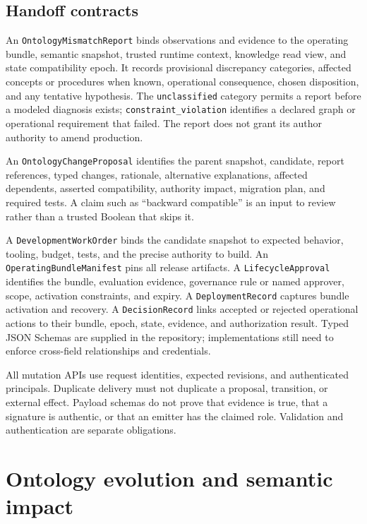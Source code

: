 \documentclass[preprint,12pt,authoryear]{elsarticle}
\begin{document}
\subsection{Handoff contracts}\label{handoff-contracts}

An \texttt{OntologyMismatchReport} binds observations and evidence to
the operating bundle, semantic snapshot, trusted runtime context,
knowledge read view, and state compatibility epoch. It records
provisional discrepancy categories, affected concepts or procedures when
known, operational consequence, chosen disposition, and any tentative
hypothesis. The \texttt{unclassified} category permits a report before a
modeled diagnosis exists; \texttt{constraint\_violation} identifies a
declared graph or operational requirement that failed. The report does
not grant its author authority to amend production.

An \texttt{OntologyChangeProposal} identifies the parent snapshot,
candidate, report references, typed changes, rationale, alternative
explanations, affected dependents, asserted compatibility, authority
impact, migration plan, and required tests. A claim such as ``backward
compatible'' is an input to review rather than a trusted Boolean that
skips it.

A \texttt{DevelopmentWorkOrder} binds the candidate snapshot to expected
behavior, tooling, budget, tests, and the precise authority to build. An
\texttt{OperatingBundleManifest} pins all release artifacts. A
\texttt{LifecycleApproval} identifies the bundle, evaluation evidence,
governance rule or named approver, scope, activation constraints, and
expiry. A \texttt{DeploymentRecord} captures bundle activation and
recovery. A \texttt{DecisionRecord} links accepted or rejected
operational actions to their bundle, epoch, state, evidence, and
authorization result. Typed JSON Schemas are supplied in the repository;
implementations still need to enforce cross-field relationships and
credentials.

All mutation APIs use request identities, expected revisions, and
authenticated principals. Duplicate delivery must not duplicate a
proposal, transition, or external effect. Payload schemas do not prove
that evidence is true, that a signature is authentic, or that an emitter
has the claimed role. Validation and authentication are separate
obligations.

\section{Ontology evolution and semantic
impact}\label{ontology-evolution-and-semantic-impact}
\end{document}
